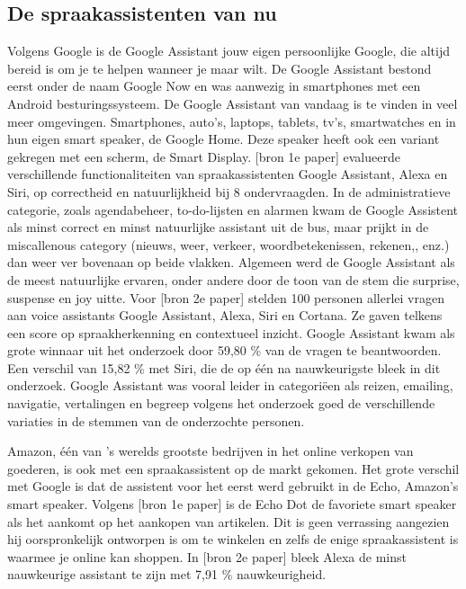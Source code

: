 \subsection{De spraakassistenten van nu}
Volgens Google is de Google Assistant jouw eigen persoonlijke Google, die altijd bereid is om je te helpen wanneer je maar wilt. De Google Assistant bestond eerst onder de naam Google Now en was aanwezig in smartphones met een Android besturingssysteem. De Google Assistant van vandaag is te vinden in veel meer omgevingen. Smartphones, auto's, laptops, tablets, tv's, smartwatches en in hun eigen smart speaker, de Google Home. Deze speaker heeft ook een variant gekregen met een scherm, de Smart Display.
[bron 1e paper] evalueerde verschillende functionaliteiten van spraakassistenten Google Assistant, Alexa en Siri, op correctheid en natuurlijkheid bij 8 ondervraagden. In de administratieve categorie, zoals agendabeheer, to-do-lijsten en alarmen kwam de Google Assistent als minst correct en minst natuurlijke assistant uit de bus, maar prijkt in de miscallenous category (nieuws, weer, verkeer, woordbetekenissen, rekenen,, enz.) dan weer ver bovenaan op beide vlakken. Algemeen werd de Google Assistant als de meest natuurlijke ervaren, onder andere door de toon van de stem die surprise, suspense en joy uitte.
Voor [bron 2e paper] stelden 100 personen allerlei vragen aan voice assistants Google Assistant, Alexa, Siri en Cortana. Ze gaven telkens een score op spraakherkenning en contextueel inzicht. Google Assistant kwam als grote winnaar uit het onderzoek door 59,80 \% van de vragen te beantwoorden. Een verschil van 15,82 \% met Siri, die de op één na nauwkeurigste bleek in dit onderzoek. Google Assistant was vooral leider in categoriëen als reizen, emailing, navigatie, vertalingen en begreep volgens het onderzoek goed de verschillende variaties in de stemmen van de onderzochte personen.

Amazon, één van 's werelds grootste bedrijven in het online verkopen van goederen, is ook met een spraakassistent op de markt gekomen. Het grote verschil met Google is dat de assistent voor het eerst werd gebruikt in de Echo, Amazon's smart speaker. Volgens [bron 1e paper] is de Echo Dot de favoriete smart speaker als het aankomt op het aankopen van artikelen. Dit is geen verrassing aangezien hij oorspronkelijk ontworpen is om te winkelen en zelfs de enige spraakassistent is waarmee je online kan shoppen. In [bron 2e paper] bleek Alexa de minst nauwkeurige assistant te zijn met 7,91 \% nauwkeurigheid.

